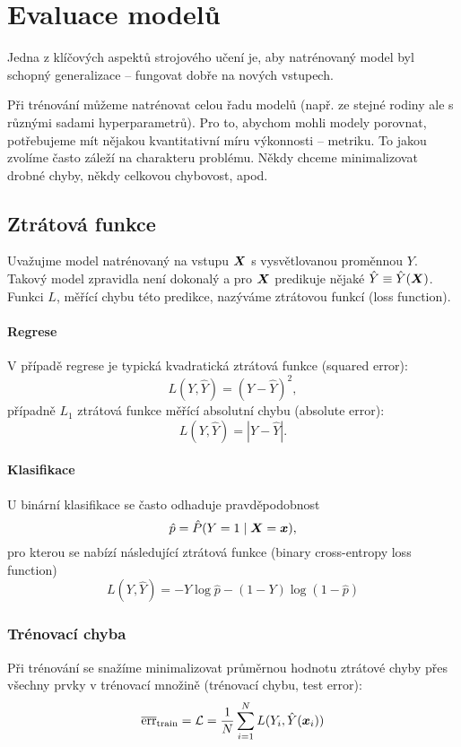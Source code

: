 \documentclass[../main.tex]{subfiles}
\begin{document}
\section{Evaluace modelů}

Jedna z klíčových aspektů strojového učení je, aby natrénovaný model byl schopný generalizace -- fungovat dobře na nových vstupech.

Při trénování můžeme natrénovat celou řadu modelů (např. ze stejné rodiny ale s různými sadami hyperparametrů). Pro to, abychom mohli modely porovnat, potřebujeme mít nějakou kvantitativní míru výkonnosti -- metriku. To jakou zvolíme často záleží na charakteru problému. Někdy chceme minimalizovat drobné chyby, někdy celkovou chybovost, apod.

\subsection{Ztrátová funkce}

Uvažujme model natrénovaný na vstupu $\bm{X}$ s vysvětlovanou proměnnou $Y$. Takový model zpravidla není dokonalý a pro $\bm{X}$ predikuje nějaké $\hat{Y} \equiv \hat{Y}(\bm{X})$. Funkci $L$, měřící chybu této predikce, nazýváme ztrátovou funkcí (loss function).

\paragraph{Regrese} V případě regrese je typická kvadratická ztrátová funkce (squared error): \[L(Y, \hat{Y}) = (Y - \hat{Y})^2, \] případně $L_1$  ztrátová funkce měřící absolutní chybu (absolute error): \[L(Y, \hat{Y}) = |Y - \hat{Y}|.\]

\paragraph{Klasifikace} U binární klasifikace se často odhaduje pravděpodobnost \[\hat{p} = \hat{P}(Y=1 \mid \bm{X} = \bm{x}),\] pro kterou se nabízí následující ztrátová funkce (binary cross-entropy loss function) \[L(Y, \hat{Y}) = -Y\log\hat{p} - (1-Y)\log(1-\hat{p})\]

\subsubsection{Trénovací chyba}

Při trénování se snažíme minimalizovat průměrnou hodnotu ztrátové chyby přes všechny prvky v trénovací množině (trénovací chybu, test error): \[\overline{\text{err}}_{\text{train}} = \mathcal{L} = \frac{1}{N} \sum_{i=1}^{N} L(Y_i, \hat{Y}(\bm{x}_i))\]
\end{document}
